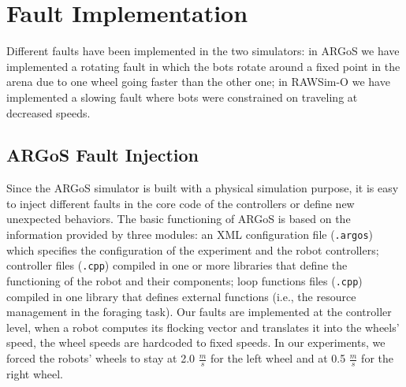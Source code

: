 \documentclass[../../Thesis.tex]{subfiles}
\begin{document}
		\section{Fault Implementation}
			Different faults have been implemented in the two simulators: in ARGoS we have implemented a rotating fault in which the bots rotate around a fixed point in the arena due to one wheel going faster than the other one; in RAWSim-O we have implemented a slowing fault where bots were constrained on traveling at decreased speeds.
		
			\subsection{ARGoS Fault Injection}
				Since the ARGoS simulator is built with a physical simulation purpose, it is easy to inject different faults in the core code of the controllers or define new unexpected behaviors. The basic functioning of ARGoS is based on the information provided by three modules: an XML configuration file (\verb|.argos|) which specifies the configuration of the experiment and the robot controllers; controller files (\verb|.cpp|) compiled in one or more libraries that define the functioning of the robot and their components; loop functions files (\verb|.cpp|) compiled in one library that defines external functions (i.e., the resource management in the foraging task). Our faults are implemented at the controller level,  when a robot computes its flocking vector and translates it into the wheels' speed, the wheel speeds are hardcoded to fixed speeds. In our experiments, we forced the robots' wheels to stay at 2.0 $\frac{m}{s}$ for the left wheel and at 0.5 $\frac{m}{s}$ for the right wheel.
			
\end{document}
